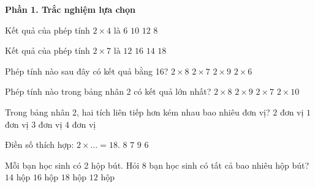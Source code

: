 \textbf{Phần 1. Trắc nghiệm lựa chọn}

\begin{ex} %
Kết quả của phép tính $2 \times 4$ là
\choice
{$6$}
{$10$}
{$12$}
{\True $8$}
\end{ex}

\begin{ex} %
Kết quả của phép tính $2 \times 7$ là
\choice
{$12$}
{$16$}
{\True $14$}
{$18$}
\end{ex}

\begin{ex} %
Phép tính nào sau đây có kết quả bằng 16?
\choice
{\True $2 \times 8$}
{$2 \times 7$}
{$2 \times 9$}
{$2 \times 6$}
\end{ex}

\begin{ex} %
Phép tính nào trong bảng nhân 2 có kết quả lớn nhất?
\choice
{$2 \times 8$}
{$2 \times 9$}
{$2 \times 7$}
{\True $2 \times 10$}
\end{ex}

\begin{ex} %
Trong bảng nhân 2, hai tích liên tiếp hơn kém nhau bao nhiêu đơn vị?
\choice
{\True $2$ đơn vị}
{$1$ đơn vị}
{$3$ đơn vị}
{$4$ đơn vị}
\end{ex}

\begin{ex} %
Điền số thích hợp: $2 \times \dots = 18$.
\choice
{$8$}
{$7$}
{\True $9$}
{$6$}
\end{ex}

\begin{ex} %
Mỗi bạn học sinh có 2 hộp bút. Hỏi 8 bạn học sinh có tất cả bao nhiêu hộp bút?
\choice
{$14$ hộp}
{\True $16$ hộp}
{$18$ hộp}
{$12$ hộp}
\end{ex}

